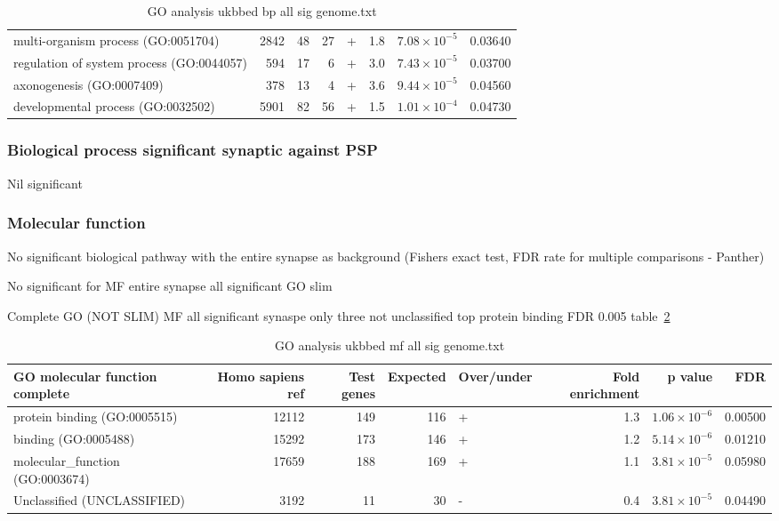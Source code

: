 \begin{table}[ht]
\begin{adjustbox}{width=\textwidth}
\begin{tabular}{lrrrlrrr}
  multi-organism process (GO:0051704) & 2842 & 48 & 27 & + & 1.8 & $7.08 \times 10^{-5}$ & 0.03640 \\ 
  regulation of system process (GO:0044057) & 594 & 17 & 6 & + & 3.0 & $7.43 \times 10^{-5}$ & 0.03700 \\ 
  axonogenesis (GO:0007409) & 378 & 13 & 4 & + & 3.6 & $9.44 \times 10^{-5}$ & 0.04560 \\ 
  developmental process (GO:0032502) & 5901 & 82 & 56 & + & 1.5 & $1.01 \times 10^{-4}$ & 0.04730 \\ 
   \hline
\end{tabular}
\end{adjustbox}
\caption{GO analysis ukbbed bp all sig genome.txt} 
\label{tab:GO analysis ukbbed_bp_all_sig_genome.txt}

\end{table}


\subsubsection{Biological process significant synaptic against PSP}
Nil significant
\subsubsection{Molecular function}
No significant biological pathway with the entire synapse as background (Fishers exact test, FDR rate for multiple comparisons - Panther)

No significant for MF entire synapse all significant GO slim

Complete GO (NOT SLIM) MF all significant synaspe only three not unclassified top protein binding FDR 0.005 table~\ref{tab:GO analysis ukbbed mf all sig genome.txt}




\begin{table}[ht]
\centering
\begin{adjustbox}{width=\textwidth}
\begin{tabular}{lrrrlrrr}
  \hline
GO molecular function complete & Homo sapiens ref & Test genes & Expected & Over/under & Fold enrichment & p value & FDR \\ 
  \hline
protein binding (GO:0005515) & 12112 & 149 & 116 & + & 1.3 & $1.06 \times 10^{-6}$ & 0.00500 \\ 
  binding (GO:0005488) & 15292 & 173 & 146 & + & 1.2 & $5.14 \times 10^{-6}$ & 0.01210 \\ 
  molecular\_function (GO:0003674) & 17659 & 188 & 169 & + & 1.1 & $3.81 \times 10^{-5}$ & 0.05980 \\ 
  Unclassified (UNCLASSIFIED) & 3192 & 11 & 30 & - & 0.4 & $3.81 \times 10^{-5}$ & 0.04490 \\ 
   \hline
\end{tabular}
\end{adjustbox}
\caption{GO analysis ukbbed mf all sig genome.txt} 
\label{tab:GO analysis ukbbed mf all sig genome.txt}
\end{table}

